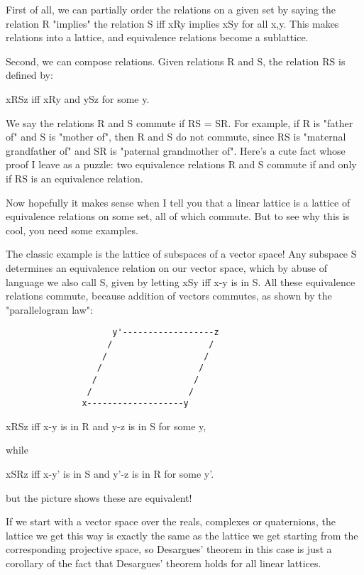 First of all, we can partially order the relations on a given set by
saying the relation R "implies" the relation S iff xRy implies
xSy for all x,y.  This makes relations into a lattice, and equivalence
relations become a sublattice.

Second, we can compose relations.  Given relations R and S, the 
relation RS is defined by:

xRSz iff xRy and ySz for some y.


We say the relations R and S commute if RS = SR.  For example, if R is
"father of" and S is "mother of", then R and S do
not commute, since RS is "maternal grandfather of" and SR is
"paternal grandmother of".  Here's a cute fact whose proof I
leave as a puzzle: two equivalence relations R and S commute if and only
if RS is an equivalence relation.

Now hopefully it makes sense when I tell you that a linear lattice is a
lattice of equivalence relations on some set, all of which commute.  But
to see why this is cool, you need some examples.  

The classic example is the lattice of subspaces of a vector space!  Any
subspace S determines an equivalence relation on our vector space, which
by abuse of language we also call S, given by letting xSy iff x-y is in
S.  All these equivalence relations commute, because addition of vectors
commutes, as shown by the "parallelogram law":

                         
\begin{verbatim}
                     y'------------------z
                    /                   /
                   /                   /
                  /                   /  
                 /                   /
                /                   /
               x-------------------y
\end{verbatim}
    
xRSz iff x-y is in R and y-z is in S for some y, 

while

xSRz iff x-y' is in S and y'-z is in R for some y'.

but the picture shows these are equivalent!

If we start with a vector space over the reals, complexes or
quaternions, the lattice we get this way is exactly the same as the
lattice we get starting from the corresponding projective space, so
Desargues' theorem in this case is just a corollary of the fact that
Desargues' theorem holds for all linear lattices.

